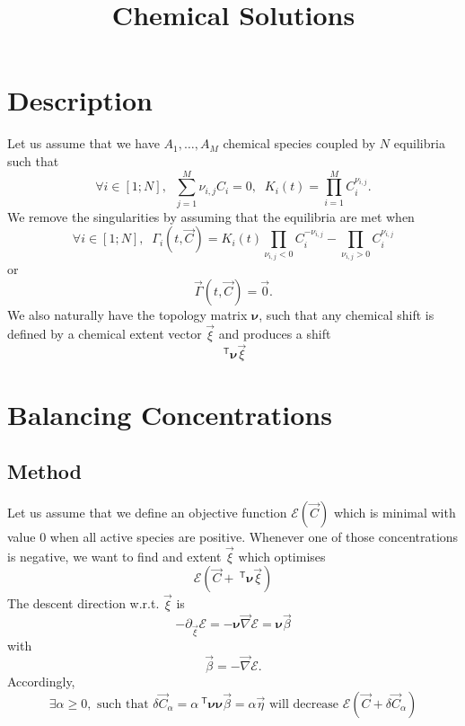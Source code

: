 \documentclass[aps]{revtex4}
\newcommand{\mymat}[1]{\bm{#1}}
\newcommand{\mytrn}[1]{~^{\mathsf{T}}{#1}}
\newcommand{\mygrad}{\vec{\nabla}}
\begin{document}
\title{Chemical Solutions}

\section{Description}
Let us assume that we have $A_1,\ldots,A_M$ chemical species coupled by
$N$ equilibria such that
\begin{equation}
	\forall i \in [1;N], \;\; \sum_{j=1}^{M} \nu_{i,j} C_i = 0, \;\; K_i(t) = \prod_{i=1}^{M} C_i^{\nu_{i,j}}.
\end{equation}
We remove the singularities by assuming that the equilibria are met when
\begin{equation}
	\forall i \in [1;N], \;\; \Gamma_i(t,\vec{C}) = K_i(t) \prod_{\nu_{i,j}<0}  C_i^{-\nu_{i,j}} -  \prod_{\nu_{i,j}>0} C_i^{\nu_{i,j}} 
\end{equation}
or
\begin{equation}
	\vec{\Gamma}(t,\vec{C}) = \vec{0}.
\end{equation}
We also naturally have the topology matrix $\mymat{\nu}$, such that
any chemical shift is defined by a  chemical extent vector $\vec{\xi}$ and
produces a shift
$$
	\mytrn{\mymat{\nu}}\vec{\xi}
$$

\section{Balancing Concentrations}
\subsection{Method}

Let us assume that we define an objective function $\mathcal{E}\left(\vec{C}\right)$ which is minimal with value 0 when all active species are positive. Whenever one of those concentrations is negative, we want to find and extent $\vec{\xi}$ which optimises 
\begin{equation}
	\mathcal{E}\left(\vec{C}+\mytrn{\mymat{\nu}}\vec{\xi}\right)
\end{equation}
The descent direction w.r.t. $\vec{\xi}$ is
\begin{equation}
	-\partial_{\vec{\xi}} \mathcal{E} = -\mymat{\nu} \mygrad \mathcal{E} = \mymat{\nu} \vec{\beta}
\end{equation}
with
\begin{equation}
	\vec{\beta} = -\mygrad \mathcal{E}.
\end{equation}
Accordingly, 
\begin{equation}
\exists \alpha \geq 0,\text{ such that }\delta\vec{C}_\alpha 
= \alpha \mytrn{\mymat{\nu}} \mymat{\nu} \vec{\beta}
= \alpha \vec{\eta} \text{ will decrease } \mathcal{E}\left( \vec{C}+\delta\vec{C}_\alpha \right)
\end{equation}
\end{document}

